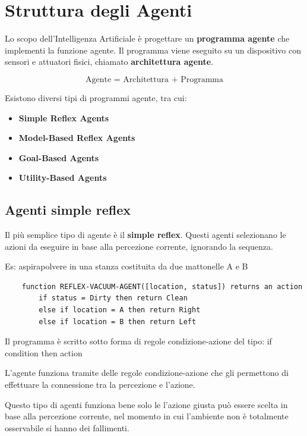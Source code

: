 \section{Struttura degli Agenti}

Lo scopo dell'Intelligenza Artificiale è progettare un
\textbf{programma agente} che implementi la funzione agente. Il programma viene eseguito su un dispositivo con sensori e attuatori fisici, chiamato \textbf{architettura agente}.

\begin{equation}
	\text{Agente = Architettura + Programma}
\end{equation}

Esistono diversi tipi di programmi agente, tra cui:

\begin{itemize}
	\item \textbf{Simple Reflex Agents}
	\item \textbf{Model-Based Reflex Agents}
	\item \textbf{Goal-Based Agents}
	\item \textbf{Utility-Based Agents}
\end{itemize}

\subsection{Agenti simple reflex}

Il più semplice tipo di agente è il \textbf{simple reflex}. Questi agenti 
selezionano le azioni da eseguire in base alla percezione corrente, ignorando
 la sequenza.

Es: aspirapolvere in una stanza costituita da due mattonelle A e B

\begin{lstlisting}
	function REFLEX-VACUUM-AGENT([location, status]) returns an action
		if status = Dirty then return Clean
		else if location = A then return Right
		else if location = B then return Left
\end{lstlisting}

Il programma è scritto sotto forma di regole condizione-azione del tipo: if condition then action

L’agente funziona tramite delle regole condizione-azione che gli permettono di effettuare la connessione tra la 
percezione e l’azione.

Questo tipo di agenti funziona bene solo le l’azione giusta può essere scelta
in base alla percezione corrente, nel momento in cui l’ambiente non è
totalmente osservabile si hanno dei fallimenti.


